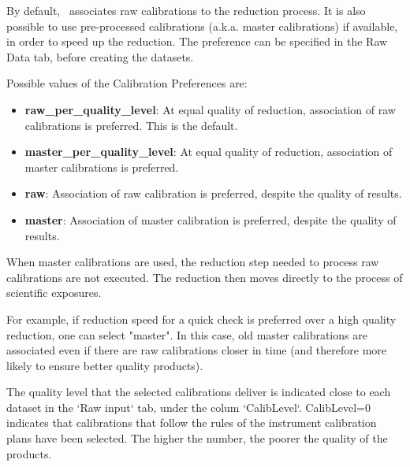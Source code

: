 By default, \edps\ associates raw calibrations to the reduction
process. It is also possible to use pre-processed calibrations
(a.k.a. master calibrations) if available, in order to speed up the
reduction.  The preference can be specified in the Raw Data tab,
before creating the datasets.



Possible values of the Calibration Preferences are:

\begin{itemize}

 \item {\bf raw\_per\_quality\_level}: At equal quality of reduction,
   association of raw calibrations is preferred. This is the default.

\item {\bf master\_per\_quality\_level}: At equal quality of
  reduction, association of master calibrations is preferred.

\item {\bf raw}: Association of raw calibration is preferred, despite
  the quality of results.
  
\item {\bf master}: Association of master calibration is preferred,
  despite the quality of results.
\end{itemize}

When master calibrations are used, the reduction step needed to
process raw calibrations are not executed. The reduction then moves
directly to the process of scientific exposures.

For example, if reduction speed for a quick check is preferred over a
high quality reduction, one can select "master".  In this case, old
master calibrations are associated even if there are raw calibrations
closer in time (and therefore more likely to ensure better quality
products).

The quality level that the selected calibrations deliver is indicated
close to each dataset in the `Raw input` tab, under the colum
`CalibLevel`. CalibLevel=0 indicates that calibrations that follow the
rules of the instrument calibration plans have been selected. The
higher the number, the poorer the quality of the products.


